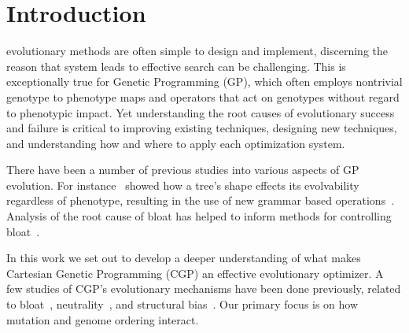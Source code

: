\documentclass[journal]{IEEEtran}
\begin{document}
%
\IEEEpeerreviewmaketitle



\section{Introduction}
% 
% 
% 
% 
 evolutionary methods are often simple to design
and implement, discerning the reason that system
leads to effective search can be challenging.
This is exceptionally
true for Genetic Programming (GP), which often employs nontrivial
genotype to phenotype maps and operators that act on genotypes without regard to
phenotypic impact.  Yet understanding the root causes of evolutionary success
and failure is critical to improving existing techniques, designing new techniques,
and understanding how and where to apply each optimization system.

There have been a number of previous studies into various aspects of GP evolution.
For instance~\cite{daida3:2003:treebias} showed how a tree's shape effects its evolvability
regardless of phenotype,
resulting in the use of new grammar based operations~\cite{xuan:2006:grammar}.
Analysis of the root cause of bloat has helped to inform methods for controlling
bloat~\cite{luke:2006:bloat}.

In this work we set out to develop a deeper understanding of what makes Cartesian
Genetic Programming (CGP) an effective evolutionary optimizer.
A few studies of CGP's evolutionary mechanisms have
been done previously, related to bloat~\cite{miller:2001:bloat},
neutrality~\cite{vassilev:2000:neutrality}, and structural bias~\cite{payne:2009:bias}.
Our primary focus is
on how mutation and genome ordering interact.
\end{document}
